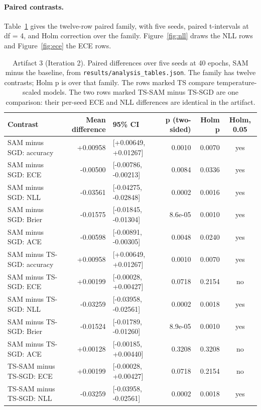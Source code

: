 \documentclass[11pt,letterpaper]{article}
\begin{document}
\paragraph{Paired contrasts.} Table~\ref{tab:primary} gives the twelve-row paired family, with five seeds, paired t-intervals at df = 4, and Holm correction over the family. Figure~\ref{fig:nll} draws the NLL rows and Figure~\ref{fig:ece} the ECE rows.

\begin{table}[!htbp]
\centering
\footnotesize
\caption{Artifact 3 (Iteration 2). Paired differences over five seeds at 40 epochs, SAM minus the baseline, from \texttt{results/analysis\_tables.json}. The family has twelve contrasts; Holm p is over that family. The rows marked TS compare temperature-scaled models. The two rows marked TS-SAM minus TS-SGD are one comparison: their per-seed ECE and NLL differences are identical in the artifact.}
\label{tab:primary}
\begin{tabularx}{\linewidth}{>{\raggedright\arraybackslash}X r l r r c}
\toprule
Contrast & Mean difference & 95\% CI & p (two-sided) & Holm p & Holm, 0.05 \\
\midrule
SAM minus SGD: accuracy & +0.00958 & [+0.00649, +0.01267] & 0.0010 & 0.0070 & yes \\
SAM minus SGD: ECE & -0.00500 & [-0.00786, -0.00213] & 0.0084 & 0.0336 & yes \\
SAM minus SGD: NLL & -0.03561 & [-0.04275, -0.02848] & 0.0002 & 0.0016 & yes \\
SAM minus SGD: Brier & -0.01575 & [-0.01845, -0.01304] & 8.6e-05 & 0.0010 & yes \\
SAM minus SGD: ACE & -0.00598 & [-0.00891, -0.00305] & 0.0048 & 0.0240 & yes \\
SAM minus TS-SGD: accuracy & +0.00958 & [+0.00649, +0.01267] & 0.0010 & 0.0070 & yes \\
SAM minus TS-SGD: ECE & +0.00199 & [-0.00028, +0.00427] & 0.0718 & 0.2154 & no \\
SAM minus TS-SGD: NLL & -0.03259 & [-0.03958, -0.02561] & 0.0002 & 0.0018 & yes \\
SAM minus TS-SGD: Brier & -0.01524 & [-0.01789, -0.01260] & 8.9e-05 & 0.0010 & yes \\
SAM minus TS-SGD: ACE & +0.00128 & [-0.00185, +0.00440] & 0.3208 & 0.3208 & no \\
TS-SAM minus TS-SGD: ECE & +0.00199 & [-0.00028, +0.00427] & 0.0718 & 0.2154 & no \\
TS-SAM minus TS-SGD: NLL & -0.03259 & [-0.03958, -0.02561] & 0.0002 & 0.0018 & yes \\
\bottomrule
\end{tabularx}
\end{table}
\end{document}
